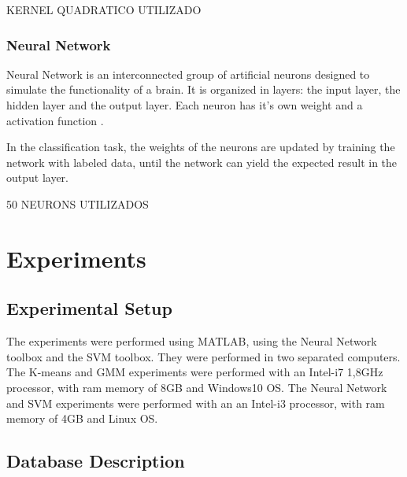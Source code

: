 \documentclass[12pt]{article}
\begin{document}
KERNEL QUADRATICO UTILIZADO


\subsubsection{Neural Network} \label{class:nn}


Neural Network is an interconnected group of artificial neurons designed to simulate the functionality of a brain. It is organized in layers: the input layer, the hidden layer and the output layer. Each neuron has it's own weight and a activation function \cite{wu2007leaf}. 

In the classification task, the weights of the neurons are updated by training the network with labeled data, until the network can yield the expected result in the output layer.

50 NEURONS UTILIZADOS


\section{Experiments} \label{exp}


\subsection{Experimental Setup} \label{exp:setup}


The experiments were performed using MATLAB, using the Neural Network toolbox and the SVM toolbox. They were performed in two separated computers. The K-means and GMM experiments were performed with an Intel-i7 1,8GHz processor, with ram memory of 8GB and Windows10 OS. The Neural Network and SVM experiments were performed with an an Intel-i3 processor, with ram memory of 4GB and Linux OS.

\subsection{Database Description} \label{exp:data}
\end{document}
